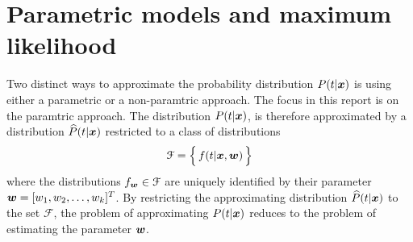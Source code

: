 \section{Parametric models and maximum likelihood}\label{sec:parametric-models-and-likelihood}
Two distinct ways to approximate the probability distribution $P(t|\boldsymbol{x})$ is using either a parametric or a non-paramtric approach. The focus in this report is on the paramtric approach. The distribution $P(t|\boldsymbol{x})$, is therefore approximated by a distribution $\widehat{P}(t|\boldsymbol{x})$ restricted to a class of distributions
\[
    \mathcal{F} = \Bigl\{\,f(t|\boldsymbol{x},\boldsymbol{w})\,\Bigr\}
\]
where the distributions $f_{\boldsymbol{w}}\in\mathcal{F}$ are uniquely identified by their parameter $\boldsymbol{w}=[w_1, w_2, \dots, w_k]^T$. By restricting the approximating distribution $\widehat{P}(t|\boldsymbol{x})$ to the set $\mathcal{F}$, the problem of approximating $P(t|\boldsymbol{x})$ reduces to the problem of estimating the parameter $\boldsymbol{w}$.

